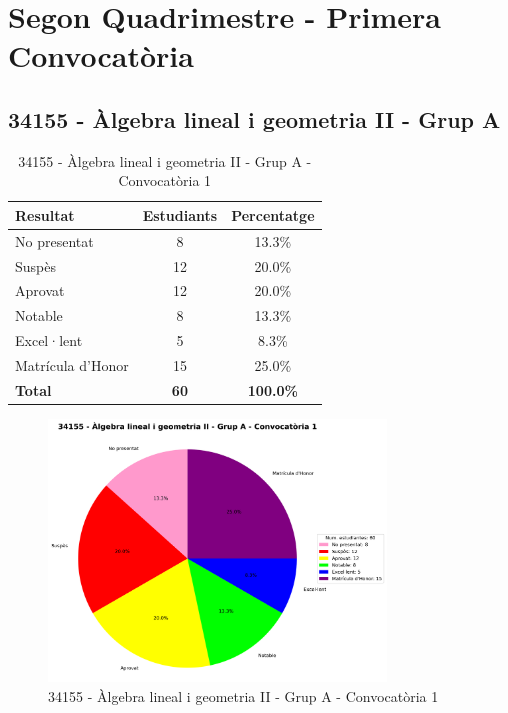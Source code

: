 \documentclass[12pt,a4paper]{article}
\begin{document}
\newpage


\section{Segon Quadrimestre - Primera Convocatòria}


\subsection{34155 - Àlgebra lineal i geometria II - Grup A}


\begin{table}[H]
\centering
\caption{34155 - Àlgebra lineal i geometria II - Grup A - Convocatòria 1}
\begin{tabular}{|l|c|c|}
\hline
\textbf{Resultat} & \textbf{Estudiants} & \textbf{Percentatge} \\
\hline
No presentat & 8 & 13.3\% \\
Suspès & 12 & 20.0\% \\
Aprovat & 12 & 20.0\% \\
Notable & 8 & 13.3\% \\
Excel·lent & 5 & 8.3\% \\
Matrícula d'Honor & 15 & 25.0\% \\
\hline
\textbf{Total} & \textbf{60} & \textbf{100.0\%} \\
\hline
\end{tabular}
\end{table}

\begin{figure}[H]
\centering
\includegraphics[width=0.8\textwidth]{graficos/34155_A_2Q1.png}
\caption{34155 - Àlgebra lineal i geometria II - Grup A - Convocatòria 1}
\end{figure}
\end{document}
